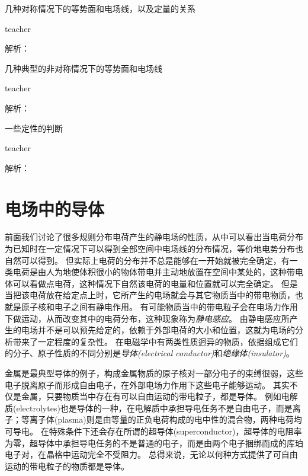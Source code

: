 \begin{example}
几种对称情况下的等势面和电场线，以及定量的关系 
\begin{taggedblock}{teacher}

解析：
\end{taggedblock}
\end{example}

\begin{example}
几种典型的非对称情况下的等势面和电场线
\begin{taggedblock}{teacher}

解析：
\end{taggedblock}
\end{example}

\begin{example}
一些定性的判断
\begin{taggedblock}{teacher}

解析：
\end{taggedblock}
\end{example}



\section{电场中的导体}

前面我们讨论了很多规则分布电荷产生的静电场的性质，从中可以看出当电荷分布为已知时在一定情况下可以得到全部空间中电场线的分布情况，等价地电势分布也自然可以得到。
但实际上电荷的分布并不总是能够在一开始就被完全确定，有一类电荷是由人为地使体积很小的物体带电并主动地放置在空间中某处的，这种带电体可以看做点电荷，这种情况下自然该电荷的电量和位置就可以完全确定。
但是当把该电荷放在给定点上时，它所产生的电场就会与其它物质当中的带电物质，也就是原子核和电子之间有静电作用。
有可能物质当中的带电粒子会在电场力作用下做运动，从而改变其中的电荷分布，这种现象称为\emph{静电感应}。
由静电感应所产生的电场并不是可以预先给定的，依赖于外部电荷的大小和位置，这就为电场的分析带来了一定程度的复杂性。
在电磁学中有两类性质迥异的物质，依据组成它们的分子、原子性质的不同分别是\emph{导体(electrical conductor)}和\emph{绝缘体(insulator)}。

金属是最典型导体的例子，构成金属物质的原子核对一部分电子的束缚很弱，这些电子脱离原子而形成自由电子，在外部电场力作用下这些电子能够运动。
其实不仅是金属，只要物质当中存在有可以自由运动的带电粒子，都是导体。
例如电解质(electrolytes)也是导体的一种，在电解质中承担导电任务不是自由电子，而是离子；等离子体(plasma)则是由等量的正负电荷构成的电中性的混合物，两种电荷均可导电。
在特殊条件下还会存在所谓的超导体(superconductor)，超导体的电阻率为零，超导体中承担导电任务的不是普通的电子，而是由两个电子捆绑而成的库珀电子对，在晶格中运动完全不受阻力。
总得来说，无论以何种方式提供了可自由运动的带电粒子的物质都是导体。

